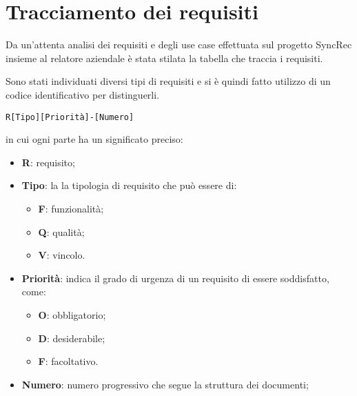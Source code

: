 \section{Tracciamento dei requisiti}

Da un'attenta analisi dei requisiti e degli use case effettuata sul progetto SyncRec insieme al relatore aziendale è stata stilata la tabella che traccia i requisiti.

Sono stati individuati diversi tipi di requisiti e si è quindi fatto utilizzo di un codice identificativo per distinguerli.


\begin{center}
	\texttt{R[Tipo][Priorità]-[Numero]}
\end{center}
in cui ogni parte ha un significato preciso:
\begin{itemize}
	\item \textbf{R}: requisito;
	\item \textbf{Tipo}: la la tipologia di requisito che può essere di:
	\begin{itemize}
		\item \textbf{F}: funzionalità;
		\item \textbf{Q}: qualità;
		\item \textbf{V}: vincolo.
	\end{itemize}
	\item \textbf{Priorità}: indica il grado di urgenza di un requisito di essere soddisfatto, come:
	\begin{itemize}
		\item \textbf{O}: obbligatorio;
		\item \textbf{D}: desiderabile;
		\item \textbf{F}: facoltativo.
	\end{itemize}
	\item \textbf{Numero}: numero progressivo che segue la struttura dei documenti;
\end{itemize}

